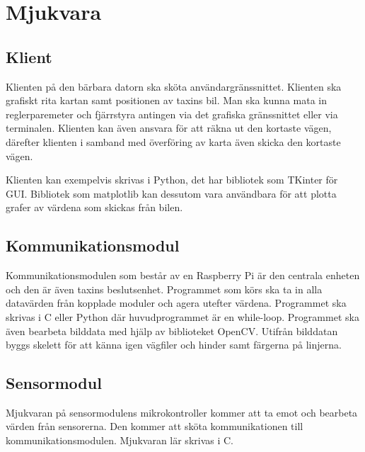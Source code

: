 \documentclass[systemskiss/skiss.tex]{subfiles}
\begin{document}
\section{Mjukvara}
\subsection{Klient}
Klienten på den bärbara datorn ska sköta användargränssnittet. Klienten ska
grafiskt rita kartan samt positionen av taxins bil. Man ska kunna mata in
reglerparemeter och fjärrstyra antingen via det grafiska gränssnittet eller via
terminalen. Klienten kan även ansvara för att räkna ut den kortaste vägen,
därefter klienten i samband med överföring av karta även skicka den
kortaste vägen.

Klienten kan exempelvis skrivas i Python, det har bibliotek som TKinter för
GUI. Bibliotek som matplotlib kan dessutom vara användbara för att plotta
grafer av värdena som skickas från bilen.

\subsection{Kommunikationsmodul}
Kommunikationsmodulen som består av en Raspberry Pi är den centrala enheten och
den är även taxins beslutsenhet. Programmet som körs ska ta in alla datavärden
från kopplade moduler och agera utefter värdena. Programmet ska skrivas i C
eller Python där huvudprogrammet är en while-loop. Programmet ska även bearbeta
bilddata med hjälp av biblioteket OpenCV. Utifrån bilddatan byggs skelett för
att känna igen vägfiler och hinder samt färgerna på linjerna.

\subsection{Sensormodul}
Mjukvaran på sensormodulens mikrokontroller kommer att ta emot och bearbeta
värden från sensorerna. Den kommer att sköta kommunikationen till
kommunikationsmodulen. Mjukvaran lär skrivas i C.
\end{document}
